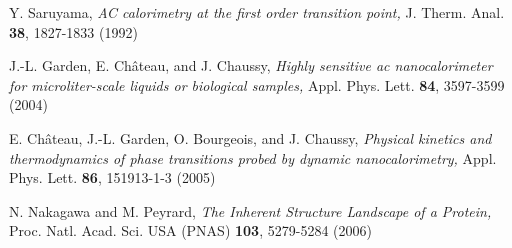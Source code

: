 \documentclass[pre,a4paper,twocolumn,superscriptaddress,%
floatfix]{revtex4}
\begin{document}
\begin{thebibliography}{xx}
Y. Saruyama,
{\it AC calorimetry at the first order transition point,}
J. Therm. Anal. {\bf 38}, 1827-1833 (1992)

J.-L. Garden, E. Ch\^{a}teau, and J. Chaussy,
{\it Highly sensitive ac nanocalorimeter for microliter-scale liquids
  or biological samples,}
Appl. Phys. Lett. {\bf 84}, 3597-3599 (2004)

E. Ch\^{a}teau, J.-L. Garden, O. Bourgeois, and J. Chaussy,
{\it Physical kinetics and thermodynamics of phase transitions probed
  by dynamic nanocalorimetry,}
Appl. Phys. Lett. {\bf 86}, 151913-1-3 (2005)

N. Nakagawa and M. Peyrard,
{\it The Inherent Structure Landscape of a Protein,}
 Proc. Natl. Acad. Sci. USA (PNAS) {\bf 103}, 5279-5284 (2006)

\end{thebibliography}
\end{document}
